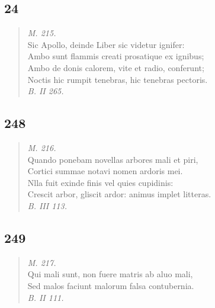 \documentclass[11pt, a4paper]{report}
\begin{document}
            \subsection*{24}
      \begin{verse}
      \textit{M. 215.} \\ Sic Apollo, deinde Liber sic videtur ignifer: \\ Ambo sunt flammis creati prosatique ex ignibus; \\ Ambo de donis calorem, vite et radio, conferunt; \\ Noctis hic rumpit tenebras, hic tenebras pectoris. \\ \textit{B. II 265.} \\ 
      \end{verse}
  
            \subsection*{248}
      \begin{verse}
      \textit{M. 216.} \\ Quando ponebam novellas arbores mali et piri, \\ Cortici summae notavi nomen ardoris mei. \\ Nlla fuit exinde finis vel quies cupidinis: \\ Crescit arbor, gliscit ardor: animus implet litteras. \\ \textit{B. III 113.} \\ 
      \end{verse}
  
            \subsection*{249}
      \begin{verse}
      \textit{M. 217.} \\ Qui mali sunt, non fuere matris ab aluo mali, \\ Sed malos faciunt malorum falsa contubernia. \\ \textit{B. II 111.} \\ 
      \end{verse}
  
\end{document}

